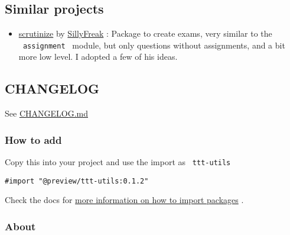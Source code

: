 \subsection{Similar projects}\label{similar-projects}

\begin{itemize}
\tightlist
\item
  \href{https://github.com/SillyFreak/typst-packages/tree/main/scrutinize}{scrutinize}
  by \href{https://github.com/SillyFreak}{SillyFreak} : Package to
  create exams, very similar to the \texttt{\ assignment\ } module, but
  only questions without assignments, and a bit more low level. I
  adopted a few of his ideas.
\end{itemize}

\subsection{CHANGELOG}\label{changelog}

See
\href{https://github.com/typst/packages/raw/main/packages/preview/ttt-utils/CHANGELOG.md}{CHANGELOG.md}

\subsubsection{How to add}\label{how-to-add}

Copy this into your project and use the import as \texttt{\ ttt-utils\ }

\begin{verbatim}
#import "@preview/ttt-utils:0.1.2"
\end{verbatim}



Check the docs for
\href{https://typst.app/docs/reference/scripting/\#packages}{more
information on how to import packages} .

\subsubsection{About}\label{about}

